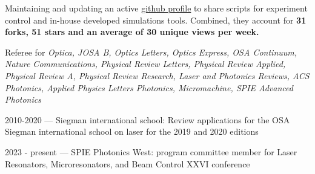\documentclass[11pt, a4paper]{customcv}
\begin{document}
%
{
    {
      \begin{cvitems} %
            \item {Maintaining and updating an active \href{https://github.com/gregmoille}{github profile}} to share scripts for experiment control and in-house developed simulations tools. Combined, they account for \textbf{31 forks, 51 stars and an average of 30 unique views per week. }
      \end{cvitems}
    }
    \vspace{1ex}
    {
      \begin{cvitems} %
            \item {Referee for \textit{Optica, JOSA B, Optics Letters, Optics Express, OSA Continuum, Nature Communications, Physical Review Letters, Physical Review Applied, Physical Review A, Physical Review Research, Laser and Photonics Reviews,  ACS Photonics, Applied Physics Letters Photonics, Micromachine, SPIE Advanced Photonics}}
      \end{cvitems}
    }
    \vspace{1ex}
    {
      \begin{cvitems} %
            \item {2010-2020 --- Siegman international school: Review applications for the OSA Siegman international school on laser for the 2019 and 2020 editions}
            \item {2023 - present --- SPIE Photonics West: program committee member for Laser Resonators, Microresonators, and Beam Control XXVI conference}
      \end{cvitems}
    }
}

%
{
    \hspace{3ex}%
    \hspace{3ex}%
        \hspace{3ex}%
     \hspace{14.7ex}%
}
\end{document}
